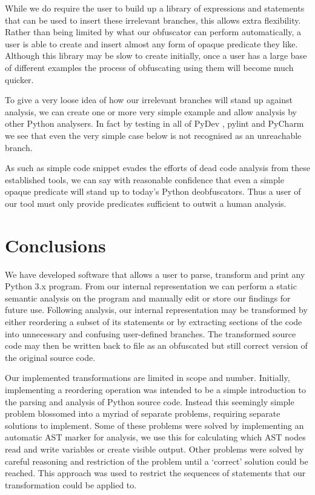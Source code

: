 \documentclass[twoside,a4paper]{report}
\begin{document}
While we do require the user to build up a library of expressions and statements that can be used to insert these irrelevant branches, this allows extra
flexibility. Rather than being limited by what our obfuscator can perform automatically, a user is able to create and insert almost any form of opaque
predicate they like. Although this library may be slow to create initially, once a user has a large base of different examples the process of obfuscating using
them will become much quicker.

To give a very loose idea of how our irrelevant branches will stand up against analysis, we can create one or more very simple example and allow analysis by
other Python analysers. In fact by testing in all of PyDev \cite{pydev}, pylint \cite{pylint} and PyCharm \cite{pycharm} we see that even the very
simple case below is not recognised as an unreachable branch.



As such as simple code snippet evades the efforts of dead code analysis from these established tools, we can say with reasonable confidence that even a
simple opaque predicate will stand up to today's Python deobfuscators. Thus a user of our tool must only provide predicates sufficient to outwit a human
analysis.

\section{Conclusions}

We have developed software that allows a user to parse, transform and print any Python 3.x program. From our internal representation we can perform a static
semantic analysis on the program and manually edit or store our findings for future use. Following analysis, our internal representation may be transformed
by either reordering a subset of its statements or by extracting sections of the code into unnecessary and confusing user-defined branches. The transformed
source code may then be written back to file as an obfuscated but still correct version of the original source code.

Our implemented transformations are limited in scope and number. Initially, implementing a reordering operation was intended to be a simple introduction
to the parsing and analysis of Python source code. Instead this seemingly simple problem blossomed into a myriad of separate problems, requiring separate
solutions to implement. Some of these problems were solved by implementing an automatic AST marker for analysis, we use this for calculating which AST nodes
read and write variables or create visible output. Other problems were solved by careful reasoning and restriction of the problem until a `correct' solution
could be reached. This approach was used to restrict the sequences of statements that our transformation could be applied to.
\end{document}
